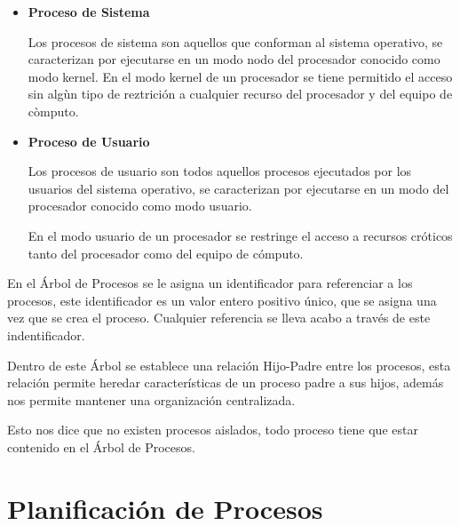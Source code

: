 \documentclass[12pt, fleqn]{report}                             %
\begin{document}
            \begin{itemize}
                \item
                    \textbf{Proceso de Sistema}

                    Los procesos de sistema son aquellos que conforman al sistema operativo, se caracterizan
                    por ejecutarse en un modo nodo del procesador conocido como modo kernel.
                    En el modo kernel de un procesador se tiene permitido el acceso sin algùn tipo de reztrición
                    a cualquier recurso del procesador y del equipo de còmputo.


                \item
                    \textbf{Proceso de Usuario}

                    Los procesos de usuario son todos aquellos procesos ejecutados por los usuarios del sistema
                    operativo, se caracterizan por ejecutarse en un modo del procesador conocido como modo usuario.

                    En el modo usuario de un procesador se restringe el acceso a recursos cróticos tanto del
                    procesador como del equipo de cómputo.

            \end{itemize}

            En el Árbol de Procesos se le asigna un identificador para referenciar a los procesos, este
            identificador es un valor entero positivo único, que se asigna una vez que se crea el proceso.
            Cualquier referencia se lleva acabo a través de este indentificador.

            Dentro de este Árbol se establece una relación Hijo-Padre entre los procesos, esta relación 
            permite heredar características de un proceso padre a sus hijos, además nos permite mantener
            una organización centralizada.

            Esto nos dice que no existen procesos aislados, todo proceso tiene que estar contenido en el
            Árbol de Procesos.



    \chapter{Planificación de Procesos}
\end{document}
